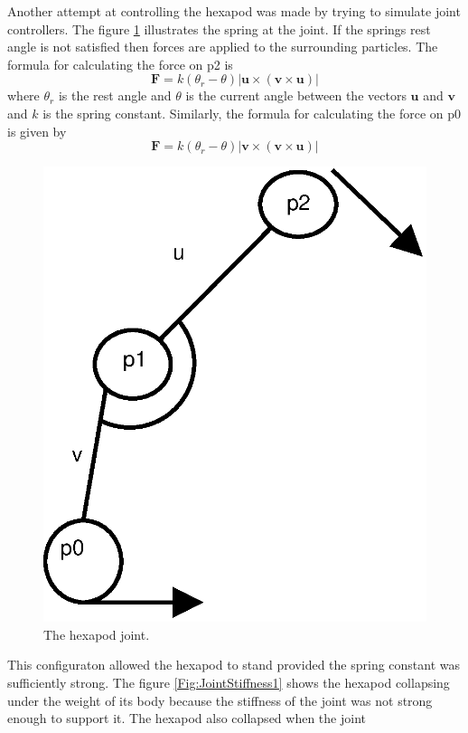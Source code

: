 Another attempt at controlling the hexapod was made by trying to simulate joint
controllers. The figure \ref{Fig:JointSpring} illustrates the spring at the
joint. If the springs rest angle is not satisfied then forces are applied to
the surrounding particles. The formula for calculating the force on p2 is 
\[
\mathbf{F} = k(\theta_r - \theta)|\mathbf{u} \times (\mathbf{v} \times
\mathbf{u})|
\]
where $\theta_r$ is the rest angle and $\theta$ is the current angle between the
vectors $\mathbf{u}$ and $\mathbf{v}$ and $k$ is the spring constant.
Similarly, the formula for calculating the force on p0 is given by
\[
 \mathbf{F} = k(\theta_r - \theta)|\mathbf{v} \times (\mathbf{v} \times
 \mathbf{u})|
\]
\begin{figure}
\centering
\includegraphics[height=0.25\textheight]{JointSpring}
\caption{\label{Fig:JointSpring}The hexapod joint.} 
\end{figure}
This configuraton allowed the hexapod to stand provided the spring constant was
sufficiently strong. The figure \ref{Fig:JointStiffness1} shows the hexapod
collapsing under the weight of its body because the stiffness of the joint was
not strong enough to support it. The hexapod also collapsed when the joint
